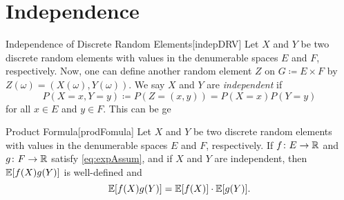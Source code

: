 \documentclass[../probability.tex]{subfiles}
\begin{document}
\section{Independence}

\begin{Definition}{Independence of Discrete Random Elements}[indepDRV]
    Let \(X\) and \(Y\) be two discrete random elements
    with values in the denumerable spaces \(E\) and \(F\), respectively.
    Now, one can define another random element \(Z\) on \(G \coloneqq E \times F\)
    by \(Z(\omega) = (X(\omega), Y(\omega))\).
    We say \(X\) and \(Y\) are \emph{independent} if
    \[
        P(X = x, Y = y) \coloneqq P(Z = (x, y)) = P(X = x) P(Y = y)
    \]
    for all \(x \in E\) and \(y \in F\).
    This can be ge
\end{Definition}

\begin{Lemma}{Product Formula}[prodFomula]
    Let \(X\) and \(Y\) be two discrete random elements
    with values in the denumerable spaces \(E\) and \(F\), respectively.
    If \(f \colon E \to \RR\) and \(g \colon F \to \RR\)
    satisfy \eqref{eq:expAssum}, and if \(X\) and \(Y\)
    are independent, then \(\mathbb{E}[f(X)g(Y)]\) is well-defined and
    \[
        \mathbb{E}[f(X)g(Y)] = \mathbb{E}[f(X)]\cdot \mathbb{E}[g(Y)]\text.
    \]
\end{Lemma}


\end{document}
